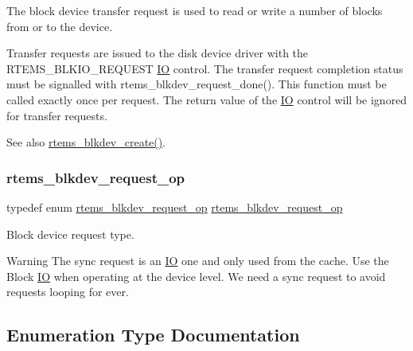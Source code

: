 The block device transfer request is used to read or write a number of blocks from or to the device. 

Transfer requests are issued to the disk device driver with the R\+T\+E\+M\+S\+\_\+\+B\+L\+K\+I\+O\+\_\+\+R\+E\+Q\+U\+E\+ST \mbox{\hyperlink{structIO}{IO}} control. The transfer request completion status must be signalled with rtems\+\_\+blkdev\+\_\+request\+\_\+done(). This function must be called exactly once per request. The return value of the \mbox{\hyperlink{structIO}{IO}} control will be ignored for transfer requests.

\begin{DoxySeeAlso}{See also}
\mbox{\hyperlink{group__rtems__blkdev_gae2fe7e8c05fa9db0fa7c0ec4e8e4967d}{rtems\+\_\+blkdev\+\_\+create()}}. 
\end{DoxySeeAlso}
\mbox{\label{group__rtems__blkdev_ga3f09489ef7c88b70744a747573f5b741}} 
\subsubsection{\texorpdfstring{rtems\_blkdev\_request\_op}{rtems\_blkdev\_request\_op}}
{\footnotesize\ttfamily typedef enum \mbox{\hyperlink{group__rtems__blkdev_ga36465495f1b9e28347838751ca90f0fe}{rtems\+\_\+blkdev\+\_\+request\+\_\+op}}  \mbox{\hyperlink{group__rtems__blkdev_ga36465495f1b9e28347838751ca90f0fe}{rtems\+\_\+blkdev\+\_\+request\+\_\+op}}}



Block device request type. 

\begin{DoxyWarning}{Warning}
The sync request is an \mbox{\hyperlink{structIO}{IO}} one and only used from the cache. Use the Block \mbox{\hyperlink{structIO}{IO}} when operating at the device level. We need a sync request to avoid requests looping for ever. 
\end{DoxyWarning}


\subsection{Enumeration Type Documentation}
\mbox{\label{group__rtems__blkdev_ga36465495f1b9e28347838751ca90f0fe}} 
